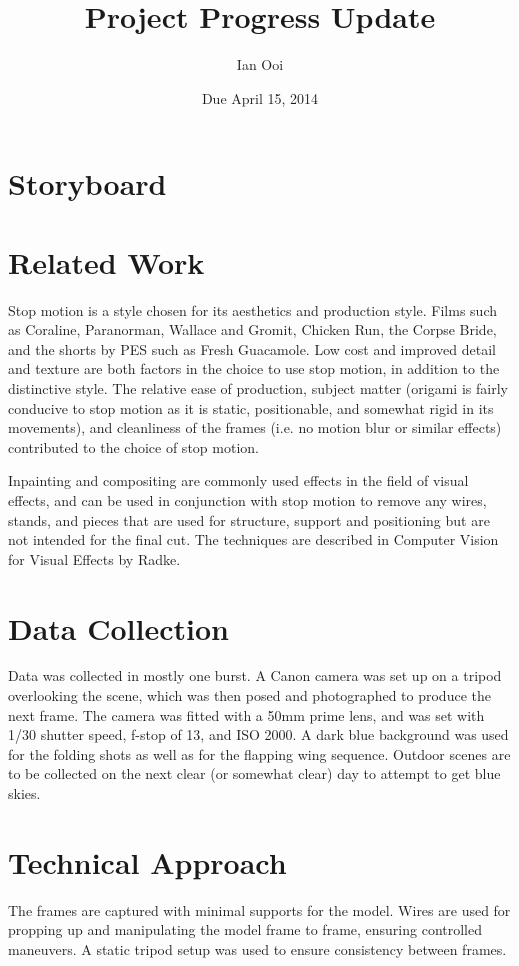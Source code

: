 \documentclass[12pt]{article}
\title{Project Progress Update}
\author{Ian Ooi}
\date{Due April 15, 2014}
\begin{document}
	\maketitle
	\section{Storyboard}
		
	\section{Related Work}
		Stop motion is a style chosen for its aesthetics and production style.  Films such as Coraline, Paranorman, Wallace and Gromit, Chicken Run, the Corpse Bride, and the shorts by PES such as Fresh Guacamole.  Low cost and improved detail and texture are both factors in the choice to use stop motion, in addition to the distinctive style.  The relative ease of production, subject matter (origami is fairly conducive to stop motion as it is static, positionable, and somewhat rigid in its movements), and cleanliness of the frames (i.e. no motion blur or similar effects) contributed to the choice of stop motion.
		
		Inpainting and compositing are commonly used effects in the field of visual effects, and can be used in conjunction with stop motion to remove any wires, stands, and pieces that are used for structure, support and positioning but are not intended for the final cut.  The techniques are described in Computer Vision for Visual Effects by Radke.
		
	\section{Data Collection}
		Data was collected in mostly one burst.  A Canon camera was set up on a tripod overlooking the scene, which was then posed and photographed to produce the next frame.  The camera was fitted with a 50mm prime lens, and was set with 1/30 shutter speed, f-stop of 13, and ISO 2000.  A dark blue background was used for the folding shots as well as for the flapping wing sequence.  Outdoor scenes are to be collected on the next clear (or somewhat clear) day to attempt to get blue skies.
		
	\section{Technical Approach}
		The frames are captured with minimal supports for the model.  Wires are used for propping up and manipulating the model frame to frame, ensuring controlled maneuvers.  A static tripod setup was used to ensure consistency between frames.	
		
\end{document}
